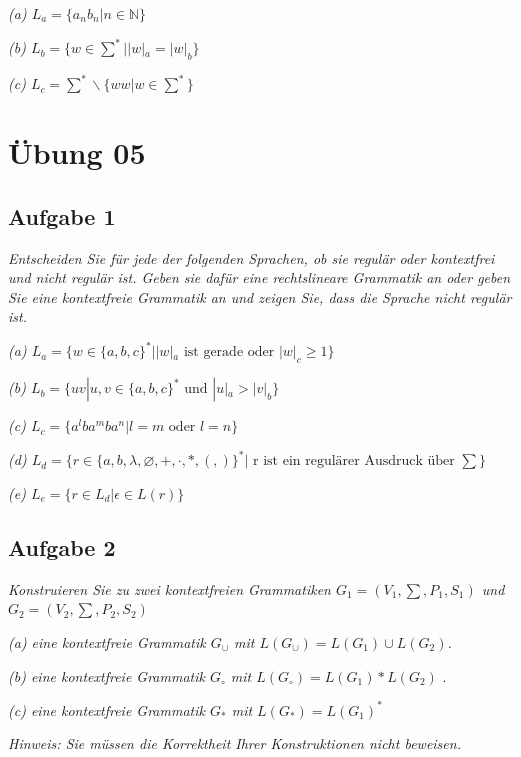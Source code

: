 \documentclass[a4paper]{article}
\begin{document}
\textit{(a) $L_a = \{a_n b_n | n\in\mathbb{N}\}$ }

\textit{(b) $L_b = \{w\in\sum^* | |w|_a = |w|_b \}$ }

\textit{(c) $L_c = \sum^*\backslash \{ww | w\in\sum^*\}$ }


\newpage
\section{Übung 05}
\subsection{Aufgabe 1}
\textit{Entscheiden Sie für jede der folgenden Sprachen, ob sie regulär oder kontextfrei und nicht regulär ist. Geben sie dafür eine rechtslineare Grammatik an oder geben Sie eine kontextfreie Grammatik an und zeigen Sie, dass die Sprache nicht regulär ist.}

\textit{(a) $L_a = \{w\in\{a, b, c\}^* | |w|_a \text{ ist gerade oder } |w|_c \geq 1\}$}

\textit{(b) $L_b = \{uv | u, v \in\{a, b, c\}^* \text{ und } |u|_a > |v|_b \}$ }

\textit{(c) $L_c = \{a^l ba^m ba^n | l = m \text{ oder } l = n\}$ }

\textit{(d) $L_d = \{r \in\{a, b, \lambda,\varnothing, +, ·, * , (, )\}^* | \text{ r ist ein regulärer Ausdruck über }\sum\}$ }

\textit{(e) $L_e = \{r \in L_d | \epsilon\in L(r)\}$ }



\subsection{Aufgabe 2}
\textit{Konstruieren Sie zu zwei kontextfreien Grammatiken $G_1 = (V_1 , \sum, P_1 , S_1 )$ und $G_2 = (V_2 , \sum, P_2 , S_2 )$}

\textit{(a) eine kontextfreie Grammatik $G_{\cup}$ mit $L(G_{\cup}) = L(G_1) \cup L(G_2)$.}

\textit{(b) eine kontextfreie Grammatik $G_{\circ}$ mit $L(G_{\circ}) = L(G_1 ) * L(G_2)$ }.

\textit{(c) eine kontextfreie Grammatik $G_*$ mit $L(G_*) = L(G_1)^*$}

\textit{Hinweis: Sie müssen die Korrektheit Ihrer Konstruktionen nicht beweisen.}
\end{document}
